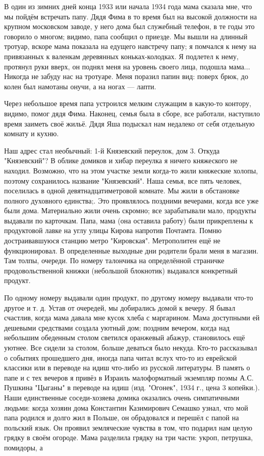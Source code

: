 \label{153-1}
В один из зимних дней конца 1933 или начала 1934 года мама сказала мне, что мы пойдём встречать папу. Дядя Фима в то время был на высокой должности на крупном московском заводе, у него дома был служебный телефон, в те годы это говорило о многом; видимо, папа сообщил о приезде. Мы вышли на длинный тротуар, вскоре мама показала на едущего навстречу папу; я помчался к нему на привязанных к валенкам деревянных коньках-колодках. Я подлетел к нему, протянул руки вверх, он поднял меня на уровень своего лица, подошла мама... Никогда не забуду нас на тротуаре. Меня поразил папин вид: поверх брюк, до колен был намотаны онучи, а на ногах — лапти.

Через небольшое время папа устроился мелким служащим в какую-то контору, видимо, помог дядя Фима. Наконец, семья была в сборе, все работали, наступило время заиметь своё жильё. Дядя Яша подыскал нам недалеко от себя отдельную комнату и кухню.

\label{154-1}
Наш адрес стал необычный: 1-й Князевский переулок, дом 3. Откуда "Князевский"? В облике домиков и хибар переулка я ничего княжеского не находил. Возможно, что на этом участке земли когда-то жили княжеские холопы, поэтому сохранилось название "Князевский". Наша семья, все пять человек, поселилась в одной девятнадцатиметровой комнате. Мы жили в обстановке полного духовного единства;. Это проявлялось поздними вечерами, когда все уже были дома. Материально жили очень скромно; все зарабатывали мало, продукты выдавали по карточкам. Папа, мама (она оставила работу) были прикреплены к продуктовой лавке на углу улицы Кирова напротив Почтамта. Помню достраивавшуюся станцию метро "Кировская". Метрополитен ещё не функционировал. В определенные выходные дни родители брали меня в магазин. Там толпы, очереди. По номеру талончика на определённой страничке продовольственной книжки (небольшой блокнотик) выдавался конкретный продукт.

\label{155-1}
По одному номеру выдавали один продукт, по другому номеру выдавали что-то другое и т. д. Устав от очередей, мы добирались домой к вечеру. Я бывал счастлив, когда мама давала мне кусок хлеба с маргарином. Мама доступными ей дешевыми средствами создала уютный дом; поздним вечером, когда над небольшим обеденным столом светился оранжевый абажур, становилось ещё уютнее. Все сидели за столом, больше деваться было некуда. Кто-то рассказывал о событиях прошедшего дня, иногда папа читал вслух что-то из еврейской классики или в переводе на идиш что-либо из русской литературы. В память о папе и с тех вечеров я привёз в Израиль малоформатный экземпляр поэмы А.С. Пушкина "Цыганы" в переводе на идиш (изд. "Огонек", 1934 г., цена 3 копейки.). Наши единственные соседи-хозяева домика оказались очень симпатичными людьми: когда хозяин дома Константин Казимирович Семашко узнал, что мой папа родился и долго жил в Польше, он обрадовался и перешёл с папой на польский язык. Он проявил земляческие чувства в том, что подарил нам целую грядку в своём огороде. Мама разделила грядку на три части: укроп, петрушка, помидоры, а 


